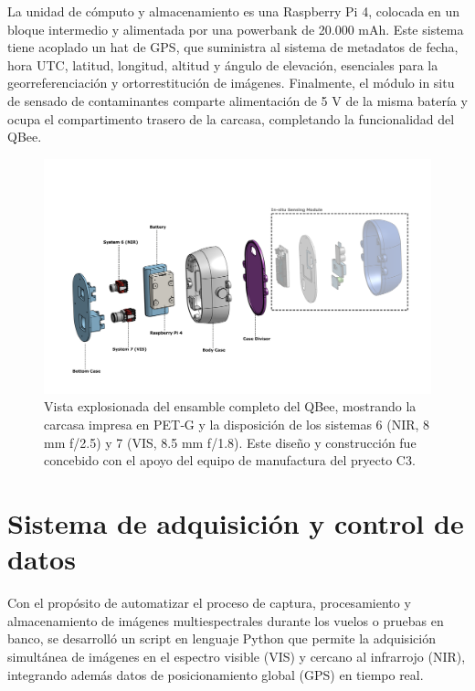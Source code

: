     \noindent La unidad de cómputo y almacenamiento es una Raspberry Pi 4, colocada en un bloque intermedio y alimentada por una powerbank de 20.000 mAh. Este sistema tiene acoplado un hat de GPS, que suministra al sistema de metadatos de fecha, hora UTC, latitud, longitud, altitud y ángulo de elevación, esenciales para la georreferenciación y ortorrestitución de imágenes. Finalmente, el módulo in situ de sensado de contaminantes comparte alimentación de 5 V de la misma batería y ocupa el compartimento trasero de la carcasa, completando la funcionalidad del QBee.\\
    
    

    \begin{figure}[h]
        \centering
        \includegraphics[width=1\linewidth]{Figures/C4/QBee.pdf}
        \caption{Vista explosionada del ensamble completo del QBee, mostrando la carcasa impresa en PET‑G y la disposición de los sistemas 6 (NIR, 8 mm f/2.5) y 7 (VIS, 8.5 mm f/1.8). Este diseño y construcción fue concebido con el apoyo del equipo de manufactura del pryecto C3.}
        \label{fig:exploded_assembly}
    \end{figure}


\section{Sistema de adquisición y control de datos}
  \label{sec:script_control_adquisicion}
  
  Con el propósito de automatizar el proceso de captura, procesamiento y almacenamiento de imágenes multiespectrales durante los vuelos o pruebas en banco, se desarrolló un script en lenguaje Python que permite la adquisición simultánea de imágenes en el espectro visible (VIS) y cercano al infrarrojo (NIR), integrando además datos de posicionamiento global (GPS) en tiempo real.
  
